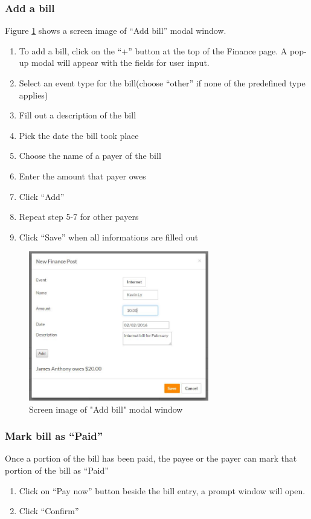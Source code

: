 \documentclass[12pt]{article}
\begin{document}
    \subsubsection{Add a bill}
    Figure \ref{fig:addBill} shows a screen image of ``Add bill'' modal window.
    \begin{enumerate}
        \item To add a bill, click on the ``+'' button at the top of the Finance page. A pop-up modal will appear with the fields for user input.
        \item Select an event type for the bill(choose ``other'' if none of the predefined type applies)
        \item Fill out a description of the bill
        \item Pick the date the bill took place
        \item Choose the name of a payer of the bill
        \item Enter the amount that payer owes
        \item Click ``Add''
        \item Repeat step 5-7 for other payers
        \item Click ``Save'' when all informations are filled out
    \end{enumerate}

    \begin{figure}
        \centering
        \includegraphics[width=0.7\textwidth]{addBill}
        \caption{Screen image of "Add bill" modal window}
        \label{fig:addBill}
    \end{figure}

    \subsubsection{Mark bill as ``Paid''}
    Once a portion of the bill has been paid, the payee or the payer can mark that portion of the bill as ``Paid''
    \begin{enumerate}
        \item Click on ``Pay now'' button beside the bill entry, a prompt window will open.
        \item Click ``Confirm''
    \end{enumerate}
\end{document}
